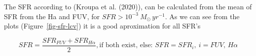 \documentclass[
]{article}
\begin{document}
The SFR according to (Kroupa et al. (2020)), can be calculated from the
mean of SFR from the Ha and FUV, for \(SFR>10^{-3}\ M_\odot\, yr^{-1}\).
As we can see from the plots (Figure~\ref{fig-sfr-lcv}) it is a good
aproximation for all SFR's

\[
SFR = \frac{SFR_{FUV}+SFR_{H\alpha}}{2}, \text{if both exist, else: } SFR = SFR_i,\ i= FUV,\, H\alpha
\]

\begin{figure}

\begin{minipage}{0.50\linewidth}



\end{minipage}%
%
\begin{minipage}{0.50\linewidth}

\end{minipage}
\end{figure}
\end{document}
